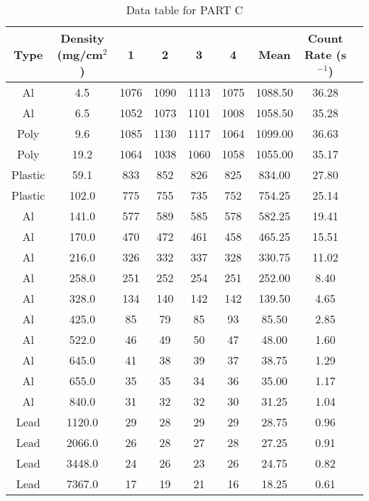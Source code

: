 \documentclass[a4paper,11pt]{article}
\begin{document}
\begin{table}[h!]
\centering
\begin{tabular}{ |c|c|c|c|c|c|c|c|c| } 
\hline
Type & Density (mg/cm\(^2\)) & 1 & 2 & 3 & 4 & Mean & Count Rate (s$^{-1}$) \\
\hline
Al & 4.5 & 1076 & 1090 & 1113 & 1075 & 1088.50 & 36.28 \\
\hline
Al & 6.5 & 1052 & 1073 & 1101 & 1008 & 1058.50 & 35.28 \\
\hline
Poly & 9.6 & 1085 & 1130 & 1117 & 1064 & 1099.00 & 36.63 \\
\hline
Poly & 19.2 & 1064 & 1038 & 1060 & 1058 & 1055.00 & 35.17 \\
\hline
Plastic & 59.1 & 833 & 852 & 826 & 825 & 834.00 & 27.80 \\
\hline
Plastic & 102.0 & 775 & 755 & 735 & 752 & 754.25 & 25.14 \\
\hline
Al & 141.0 & 577 & 589 & 585 & 578 & 582.25 & 19.41 \\
\hline
Al & 170.0 & 470 & 472 & 461 & 458 & 465.25 & 15.51 \\
\hline
Al & 216.0 & 326 & 332 & 337 & 328 & 330.75 & 11.02 \\
\hline
Al & 258.0 & 251 & 252 & 254 & 251 & 252.00 & 8.40 \\
\hline
Al & 328.0 & 134 & 140 & 142 & 142 & 139.50 & 4.65 \\
\hline
Al & 425.0 & 85 & 79 & 85 & 93 & 85.50 & 2.85 \\
\hline
Al & 522.0 & 46 & 49 & 50 & 47 & 48.00 & 1.60 \\
\hline
Al & 645.0 & 41 & 38 & 39 & 37 & 38.75 & 1.29 \\
\hline
Al & 655.0 & 35 & 35 & 34 & 36 & 35.00 & 1.17 \\
\hline
Al & 840.0 & 31 & 32 & 32 & 30 & 31.25 & 1.04 \\
\hline
Lead & 1120.0 & 29 & 28 & 29 & 29 & 28.75 & 0.96 \\
\hline
Lead & 2066.0 & 26 & 28 & 27 & 28 & 27.25 & 0.91 \\
\hline
Lead & 3448.0 & 24 & 26 & 23 & 26 & 24.75 & 0.82 \\
\hline
Lead & 7367.0 & 17 & 19 & 21 & 16 & 18.25 & 0.61 \\
\hline
\end{tabular}
\caption{Data table for PART C}
\label{table:1}
\end{table}
\end{document}
